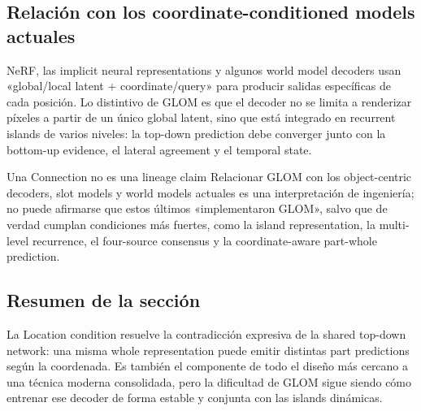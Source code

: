 \subsection{Relación con los coordinate-conditioned models actuales}

NeRF, las implicit neural representations y algunos world model decoders usan «global/local latent + coordinate/query» para producir salidas específicas de cada posición. Lo distintivo de GLOM es que el decoder no se limita a renderizar píxeles a partir de un único global latent, sino que está integrado en recurrent islands de varios niveles: la top-down prediction debe converger junto con la bottom-up evidence, el lateral agreement y el temporal state.

\begin{warningbox}{Una Connection no es una lineage claim}
Relacionar GLOM con los object-centric decoders, slot models y world models actuales es una interpretación de ingeniería; no puede afirmarse que estos últimos «implementaron GLOM», salvo que de verdad cumplan condiciones más fuertes, como la island representation, la multi-level recurrence, el four-source consensus y la coordinate-aware part-whole prediction.
\end{warningbox}

\subsection{Resumen de la sección}

La Location condition resuelve la contradicción expresiva de la shared top-down network: una misma whole representation puede emitir distintas part predictions según la coordenada. Es también el componente de todo el diseño más cercano a una técnica moderna consolidada, pero la dificultad de GLOM sigue siendo cómo entrenar ese decoder de forma estable y conjunta con las islands dinámicas.
